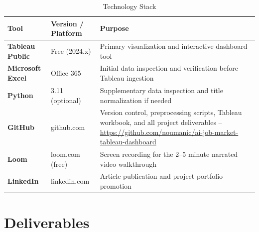 \documentclass[12pt,a4paper]{article}
\begin{document}
\begin{table}[H]
\centering
\caption{Technology Stack}
\renewcommand{\arraystretch}{1.4}
\begin{tabularx}{\linewidth}{>{\bfseries}l P{2.8cm} W}
\toprule
\textbf{Tool} & \textbf{Version / Platform} & \textbf{Purpose} \\
\midrule
Tableau Public  & Free (2024.x)   & Primary visualization and interactive dashboard tool \\
Microsoft Excel & Office 365      & Initial data inspection and verification before Tableau ingestion \\
Python          & 3.11 (optional) & Supplementary data inspection and title normalization if needed \\
GitHub          & github.com      & Version control, preprocessing scripts, Tableau workbook, and all
                                   project deliverables --
                                   \url{https://github.com/noumanic/ai-job-market-tableau-dashboard} \\
Loom            & loom.com (free) & Screen recording for the 2--5 minute narrated video walkthrough \\
LinkedIn        & linkedin.com    & Article publication and project portfolio promotion \\
\bottomrule
\end{tabularx}
\end{table}

\section{Deliverables}
\end{document}
